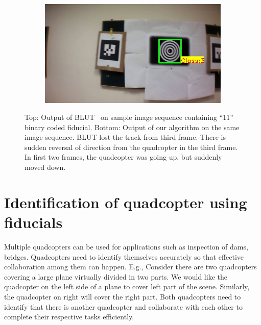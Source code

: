 \begin{figure}[ht!]
\begin{subfigure}[b]{.19\textwidth}
\end{subfigure}
\begin{subfigure}[b]{.19\textwidth}
\includegraphics[width=\linewidth]{figures/fiducial/BLUT_input_11/output6.jpg}
\end{subfigure}
\caption[Output of BLUT on ARTag and our fiducial with  code ``11'']{Top: Output
of BLUT~\cite{Wu:2011} on sample image sequence containing ``11'' binary coded fiducial. Bottom: Output of our algorithm on the same image
sequence. BLUT lost the track from third frame. There is sudden reversal of
direction from the quadcopter in the third frame. In first two frames, the quadcopter was
going up, but suddenly moved down.}
\label{fig:BLUT_compare_11}
\end{figure}


\section{Identification of quadcopter using fiducials}
Multiple quadcopters can be used for applications such as inspection of dams,
bridges. Quadcopters need to identify themselves accurately so that
effective collaboration among them can happen. E.g., Consider there are two
quadcopters covering a large plane virtually divided in two parts. We would like  
the quadcopter on the left side of a plane to cover left part of the scene. Similarly, the 
quadcopter on right will cover the right part. Both quadcopters need to identify that there
is another quadcopter and collaborate with each other to complete their respective 
tasks efficiently.

